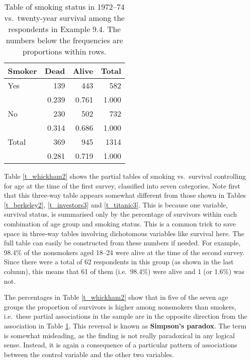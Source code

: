 \begin{table}[t]
\caption{Table of smoking status in 1972--74 vs.\ twenty-year survival
among the respondents in Example 9.4. The numbers below the frequencies
are proportions within rows.}
\label{t_whickham1}
\begin{center}
\begin{tabular}{|l|rr|r|}\hline
Smoker & Dead & Alive & Total \\ \hline
Yes & 139 & 443 & 582  \\
& 0.239 & 0.761 & 1.000 \\
No & 230 & 502 & 732 \\
& 0.314 & 0.686 & 1.000 \\ \hline
Total & 369 & 945 & 1314 \\
& 0.281 & 0.719 & 1.000  \\
\hline
\end{tabular}
\end{center}
\end{table}

Table \ref{t_whickham2} shows the partial tables of smoking vs.\
survival controlling for age at the time of the first survey, classified
into seven categories. Note first that this three-way table appears
somewhat different from those shown in Tables \ref{t_berkeley2},
\ref{t_investors3} and \ref{t_titanic3}. This is because one variable,
survival status, is summarised only by the percentage of survivors
within each combination of age group and smoking status. This is a
common trick to save space in three-way tables involving
dichotomous variables like survival here. The full table can easily be
constructed from these numbers if needed. For example, 98.4\% of the
nonsmokers aged 18--24 were alive at the time of the second survey.
Since there were a total of 62 respondents in this group (as shown in
the last column), this means that 61 of them (i.e.\ 98.4\%) were alive
and 1 (or 1.6\%) was not.

The percentages in Table \ref{t_whickham2} show that in five of the
seven age groups the proportion of survivors is higher among nonsmokers
than smokers, i.e.\ these partial associations in the sample are in the
opposite direction from the association in Table \ref{t_whickham1}. This
reversal is known as \textbf{Simpson's paradox}. The term is somewhat
misleading, as the finding is not really paradoxical in any logical
sense. Instead, it is again a consequence of a particular pattern of
associations between the control variable and the other two variables.

